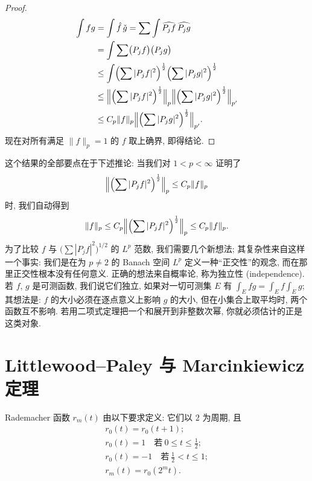 \begin{proof}
\begin{align*}
\int fg&=\int\hat{f}\,\check{g}=\sum\int\widehat{P_{j}f}\,\widehat{P_{j}g} \\
&=\int\sum\bigl(P_{j} f\bigr)\bigl(P_{j} g\bigr) \\
&\leq\int\Bigl(\sum|P_{j} f|^{2}\Bigr)^{\frac{1}{2}}\Bigl(\sum|P_{j} g|^{2}\Bigr)^{\frac{1}{2}} \\
&\leq\Bigl\|\Bigl(\sum|P_{j} f|^{2}\Bigr)^{\frac{1}{2}}\Bigr\|_{p}\Bigl\|\Bigl(\sum|P_{j} g|^{2}\Bigr)^{\frac{1}{2}}\Bigr\|_{p'} \\
&\leq C_{p}\|f\|_{p}\Bigl\|\Bigl(\sum|P_{j} g|^{2}\Bigr)^{\frac{1}{2}}\Bigr\|_{p'}.
\end{align*}
现在对所有满足 $\|f\|_p=1$ 的 $f$ 取上确界, 即得结论.
\end{proof}

\begin{remark}\label{rem:4.7}
这个结果的全部要点在于下述推论: 当我们对 $1<p<\infty$ 证明了
\[
\Bigl\|\Bigl(\sum|P_{j}f|^{2}\Bigr)^{\frac{1}{2}}\Bigr\|_{p}\leq C_{p}\|f\|_{p}
\]
时, 我们自动得到
\[
\|f\|_{p}\leq C_{p}\Bigl\|\Bigl(\sum|P_{j}f|^{2}\Bigr)^{\frac{1}{2}}\Bigr\|_{p}\leq C_{p}\|f\|_{p}.
\]
为了比较 $f$ 与 $\bigl(\sum|P_jf|^2\bigr)^{1/2}$ 的 $L^p$ 范数, 我们需要几个新想法; 其复杂性来自这样一个事实: 我们是在为 $p\neq 2$ 的 Banach 空间 $L^p$ 定义一种``正交性''的观念, 而在那里正交性根本没有任何意义. 正确的想法来自概率论, 称为独立性 (independence). 若 $f$, $g$ 是可测函数, 我们说它们独立, 如果对一切可测集 $E$ 有 $\int_Efg=\int_Ef\int_Eg$; 其想法是: $f$ 的大小必须在逐点意义上影响 $g$ 的大小, 但在小集合上取平均时, 两个函数互不影响. 若用二项式定理把一个和展开到非整数次幂, 你就必须估计的正是这类对象.
\end{remark}

\section{Littlewood--Paley 与 Marcinkiewicz 定理}
\label{sec:4.2}

\begin{definition}\label{def:4.8}
Rademacher 函数 $r_{m}(t)$ 由以下要求定义: 它们以 $2$ 为周期, 且
\begin{gather*}
r_{0}(t)=r_{0}(t+1); \\
r_{0}(t)=1\quad\text{若}\ 0\leq t\leq\frac{1}{2}; \\
r_{0}(t)=-1\quad\text{若}\ \frac{1}{2}<t\leq 1; \\
r_{m}(t)=r_{0}(2^{m}t).
\end{gather*}
\end{definition}

